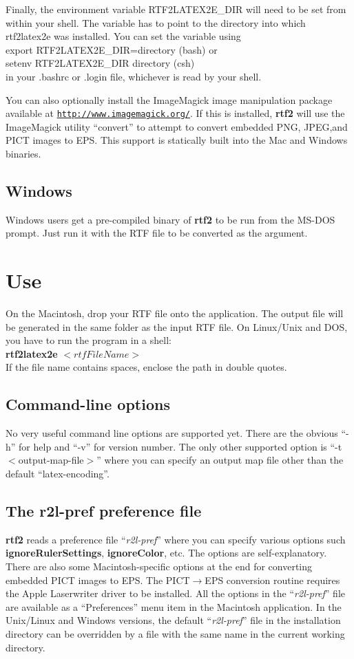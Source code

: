 \documentclass[11pt]{article}
\def\rtf2latex2e{{\bf rtf2\LaTeXe}}
\def\urlone#1{\mbox{\href{#1}{\tt #1}}}
\begin{document}
Finally, the environment variable RTF2LATEX2E\_DIR will need to be set
from within your shell.  The variable has to point to the directory into
which rtf2latex2e was installed.  You can set the variable using\\
export RTF2LATEX2E\_DIR=directory (bash) or\\ 
setenv RTF2LATEX2E\_DIR
directory (csh)\\ 
in your .bashrc or .login file, whichever is read by
your shell.

You can also optionally install the ImageMagick image manipulation package
available at \urlone{http://www.imagemagick.org/}.
If this is installed, \rtf2latex2e will use the ImageMagick
utility ``convert'' to attempt to convert embedded PNG, JPEG,and PICT
images to EPS. This support is statically built into the Mac and Windows binaries.


\subsection{Windows}
Windows users get a pre-compiled binary of \rtf2latex2e to be run from
the MS-DOS prompt. Just run it with the RTF file to be converted as the argument.

\section{Use}
On the Macintosh, drop your RTF file onto the application. The
output {\LaTeXe} file will be generated in the same folder as the input RTF file.
On Linux/Unix and DOS, you have to run the program in a shell:\\
\textbf{rtf2latex2e} $<rtfFileName>$\\
If the file name contains spaces, enclose the path in double quotes. 

\subsection{Command-line options}
No very useful command line options are supported yet.  There are the
obvious ``-h'' for help and ``-v'' for version number.  The only other
supported option is ``-t $<$output-map-file$>$'' where you can specify
an output map file other than the default ``latex-encoding''.

\subsection{The r2l-pref preference file}
\rtf2latex2e reads a preference file ``\textit{r2l-pref}'' where you can
specify various options such \textbf{ignoreRulerSettings},
\textbf{ignoreColor}, etc.  The options are self-explanatory.  There are
also some Macintosh-specific options at the end for converting embedded
PICT images to EPS.  The PICT$\rightarrow$EPS conversion routine
requires the Apple Laserwriter driver to be installed. All the options
in the ``\textit{r2l-pref}'' file are available as a
``Preferences'' menu item in the Macintosh application.  In the
Unix/Linux and Windows versions, the default ``\textit{r2l-pref}'' file
in the installation directory can be overridden by a file with the same
name in the current working directory.
\end{document}
